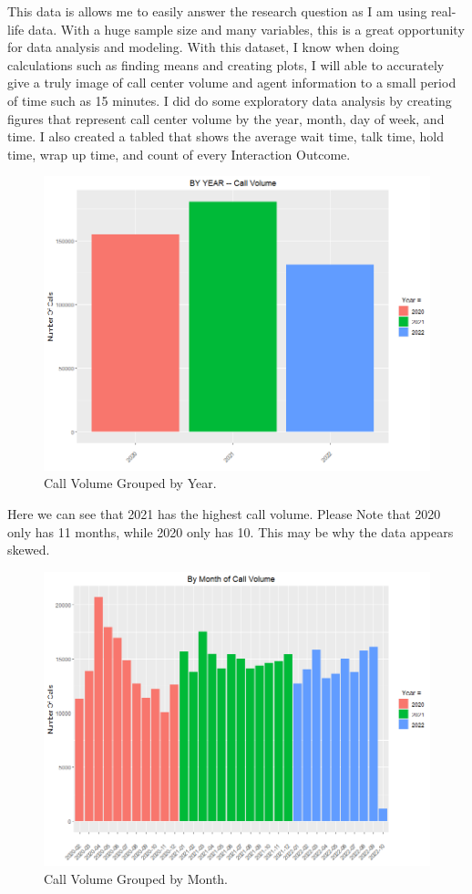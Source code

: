 \documentclass[12pt]{article}
\begin{document}
  This data is allows me to easily answer the research question as I am using real-life data. With a huge sample size and many variables,
this is a great opportunity for data analysis and modeling. With this dataset, I know when doing calculations such as finding means and creating plots, 
I will able to accurately give a truly image of call center volume and agent information to a small period of time such as 15 minutes.
  I did do some exploratory data analysis by creating figures that represent call center volume by the year, month, day of week, and time. 
I also created a tabled that shows the average wait time, talk time, hold time, wrap up time, and count of every Interaction Outcome.
\begin{figure}[H]
  \centering
  \includegraphics[width=\textwidth]{By Year.png}
  \caption{Call Volume Grouped by Year.}
  \label{fig:Year}
\end{figure}
Here we can see that 2021 has the highest call volume. Please Note that 2020 only has 11 months, while 2020 only has 10. This may be why the data appears skewed.
\begin{figure}[H]
  \centering
  \includegraphics[width=\textwidth]{ByMonthVolume.png}
  \caption{Call Volume Grouped by Month.}
  \label{fig:Month}
\end{figure}
\end{document}
